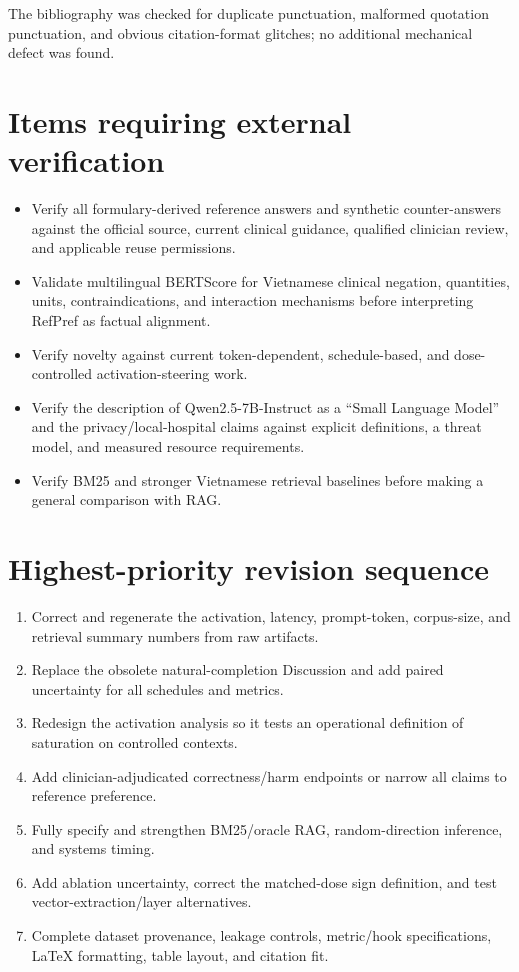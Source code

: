 \documentclass[11pt]{article}
\begin{document}
The bibliography was checked for duplicate punctuation, malformed quotation punctuation, and obvious citation-format glitches; no additional mechanical defect was found.

\section*{Items requiring external verification}

\begin{itemize}
    \item Verify all formulary-derived reference answers and synthetic counter-answers against the official source, current clinical guidance, qualified clinician review, and applicable reuse permissions.
    \item Validate multilingual BERTScore for Vietnamese clinical negation, quantities, units, contraindications, and interaction mechanisms before interpreting RefPref as factual alignment.
    \item Verify novelty against current token-dependent, schedule-based, and dose-controlled activation-steering work.
    \item Verify the description of Qwen2.5-7B-Instruct as a ``Small Language Model'' and the privacy/local-hospital claims against explicit definitions, a threat model, and measured resource requirements.
    \item Verify BM25 and stronger Vietnamese retrieval baselines before making a general comparison with RAG.
\end{itemize}

\section*{Highest-priority revision sequence}

\begin{enumerate}
    \item Correct and regenerate the activation, latency, prompt-token, corpus-size, and retrieval summary numbers from raw artifacts.
    \item Replace the obsolete natural-completion Discussion and add paired uncertainty for all schedules and metrics.
    \item Redesign the activation analysis so it tests an operational definition of saturation on controlled contexts.
    \item Add clinician-adjudicated correctness/harm endpoints or narrow all claims to reference preference.
    \item Fully specify and strengthen BM25/oracle RAG, random-direction inference, and systems timing.
    \item Add ablation uncertainty, correct the matched-dose sign definition, and test vector-extraction/layer alternatives.
    \item Complete dataset provenance, leakage controls, metric/hook specifications, LaTeX formatting, table layout, and citation fit.
\end{enumerate}
\end{document}
